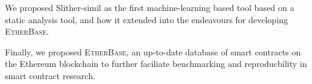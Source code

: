 \documentclass[letterpaper,12pt,onecolumn,final]{report}
\newcommand{\etherbase}{{\scshape EtherBase\xspace}}
\begin{document}
We proposed Slither-simil as the first machine-learning based tool based on a static analysis tool, and how it extended into the endeavours for developing \etherbase.

Finally, we proposed \etherbase, an up-to-date database of smart contracts on the Ethereum blockchain to further faciliate benchmarking and reproducbility in smart contract research.

\clearpage
{}
{}  %
\singlespacing %





\appendix
\setcounter{table}{0}		%
\setcounter{figure}{0}		%
\renewcommand{\thefigure}{\Alph{chapter}.\arabic{figure}} 	%
\renewcommand{\thetable}{\Alph{chapter}.\arabic{table}}		%






\end{document}

